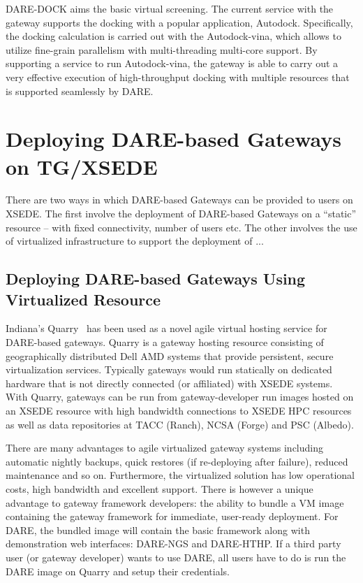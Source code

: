 \documentclass[]{svjour3}
\begin{document}

DARE-DOCK aims the basic virtual screening.  The current service with
the gateway supports the docking with a popular application,
Autodock\cite{autodock}.  Specifically, the docking calculation is
carried out with the Autodock-vina, which allows to utilize fine-grain
parallelism with multi-threading multi-core support.  By supporting a
service to run Autodock-vina, the gateway is able to carry out a very
effective execution of high-throughput docking with multiple resources
that is supported seamlessly by DARE.

%


\section{Deploying DARE-based Gateways on TG/XSEDE}

There are two ways in which DARE-based Gateways can be provided to
users on XSEDE. The first involve the deployment of DARE-based
Gateways on a ``static'' resource -- with fixed connectivity, number
of users etc. The other involves the use of virtualized infrastructure
to support the deployment of ...

\subsection{Deploying DARE-based Gateways Using Virtualized Resource}
Indiana's Quarry~\cite{quarry} has been used as a novel agile virtual hosting
service for DARE-based gateways. Quarry is a gateway hosting resource
consisting of
geographically distributed Dell AMD systems that provide persistent,
secure virtualization services. Typically gateways would run
statically on dedicated hardware that is not directly connected (or
affiliated) with XSEDE systems. With Quarry, gateways can be run from
gateway-developer run images hosted on an XSEDE resource with high
bandwidth connections to XSEDE HPC resources as well as data
repositories at TACC (Ranch), NCSA (Forge) and PSC (Albedo).

There are many advantages to agile virtualized gateway systems
including automatic nightly backups, quick restores (if re-deploying
after failure), reduced maintenance and so on. Furthermore, the
virtualized solution has low operational costs, high bandwidth and
excellent support. There is however a unique advantage to gateway
framework developers: the ability to bundle a VM image containing the
gateway framework for immediate, user-ready deployment. For DARE, the
bundled image will contain the basic framework along with
demonstration web interfaces: DARE-NGS and DARE-HTHP. If a third party
user (or gateway developer) wants to use DARE, all users have to do is
run the DARE image on Quarry and setup their credentials.
\end{document}

